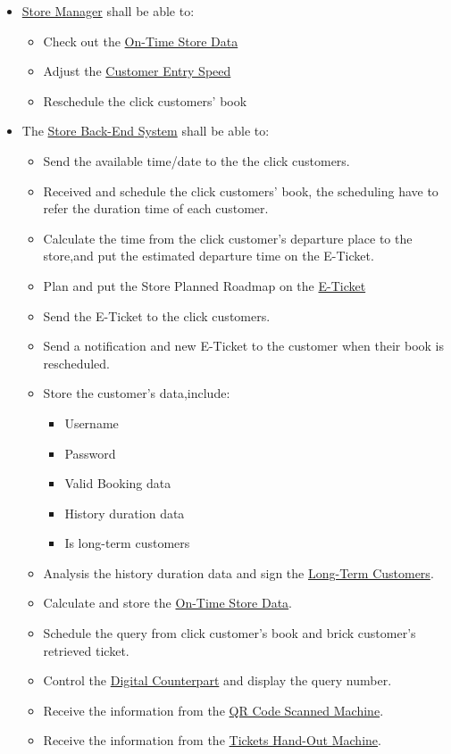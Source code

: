 \documentclass[a4paper,12pt]{book}
\begin{document}
\begin{itemize}
	\item \hyperref[Definitions]{Store Manager} shall be able to: 
	\begin{itemize}
		\item Check out the \hyperref[Definitions]{On-Time Store Data}
		\item Adjust the \hyperref[Definitions]{Customer Entry Speed}
		\item Reschedule the click customers' book
	\end{itemize}

	\item The \hyperref[Definitions]{Store Back-End System} shall be able to:
	\begin{itemize}
		\item Send the available time/date to the the click customers.
		\item Received and schedule the click customers' book, the scheduling have to refer the duration time of each customer.
		\item Calculate the time from the click customer's departure place to the store,and put the estimated departure time on the E-Ticket.
		\item Plan and put the Store Planned Roadmap on the \hyperref[Definitions]{E-Ticket}
		\item Send the  E-Ticket to the click customers.
		\item Send a notification and new E-Ticket to the customer when their book is rescheduled.
		\item Store the customer's data,include:
		\begin{itemize}
			\item Username
			\item Password
			\item Valid Booking data
			\item History duration data
			\item Is long-term customers
		\end{itemize}
		\item Analysis the history duration data and sign the \hyperref[Definitions]{Long-Term Customers}.
		\item Calculate and store the \hyperref[Definitions]{On-Time Store Data}.
		\item Schedule the query from click customer's book and brick customer's retrieved ticket.
		\item Control the \hyperref[Definitions]{Digital Counterpart} and display the query number.
		\item Receive the information from the \hyperref[Definitions]{QR Code Scanned Machine}.
		\item Receive the information from the \hyperref[Definitions]{Tickets Hand-Out Machine}.
	\end{itemize}
\end{itemize}
\end{document}
